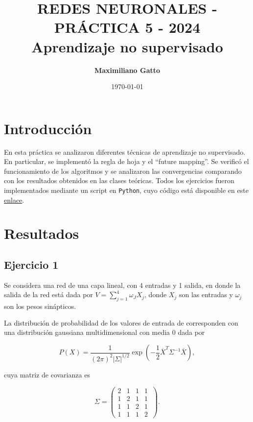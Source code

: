\documentclass[11pt, twocolumn]{article}
\title{{\large REDES NEURONALES - PRÁCTICA 5 - 2024} \\ \vspace{1cm}\textbf{Aprendizaje no supervisado}}
\author[ ]{\textbf{Maximiliano Gatto}}
\affil[ ]{Instituto Balseiro (UNCuyo - CNEA) - Bariloche, Río Negro, Argentina\vspace{0.4cm}}
\affil[ ]{\href{mailto:maximiliano.gatto@ib.edu.ar}{maximiliano.gatto@ib.edu.ar}}
\date{\today}
\begin{document}
\maketitle

\section{Introducción}

En esta práctica se analizaron diferentes técnicas de aprendizaje no supervisado. En particular, se implementó la regla de hoja y el ``future mapping''. Se verificó el funcionamiento de los algoritmos y se analizaron las convergencias comparando con los resultados obtenidos en las clases teóricas. Todos los ejercicios fueron implementados mediante un script en \texttt{Python}, cuyo código está disponible en este \href{https://github.com/elmasi2393/Redes-neuronales/tree/main}{enlace}.


\section{Resultados}

\subsection*{Ejercicio 1}
Se considera una red de una capa lineal, con 4 entradas y 1 salida, en donde la salida de la red está dada por \(V = \sum_{j=1}^4 \omega_J X_j\), donde \(X_j\) son las entradas y \(\omega_j\) son los pesos sinápticos. 

La distribución de probabilidad de los valores de entrada de corresponden con una distribución gaussiana multidimensional con media 0 dada por

\begin{equation} \nonumber
    P(X) = \frac{1}{(2\pi)^{2}|\Sigma|^{1/2}} \exp \left( -\frac{1}{2} \overline{X}^T \Sigma^{-1} \overline{X} \right),
\end{equation}

cuya matriz de covarianza es

\begin{equation} \nonumber
    \Sigma = \begin{pmatrix}
        2 & 1 & 1 & 1 \\
        1 & 2 & 1 & 1 \\
        1 & 1 & 2 & 1 \\
        1 & 1 & 1 & 2 \
    \end{pmatrix}.
\end{equation}
\\ 
\end{document}
